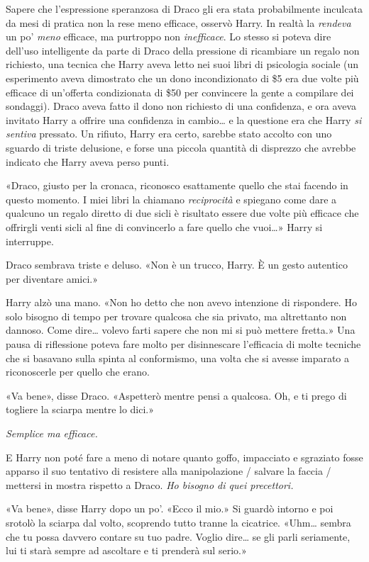 Sapere che l’espressione speranzosa di Draco gli era stata probabilmente inculcata da mesi di pratica non la rese meno efficace, osservò Harry. In realtà la \textit{rendeva} un po’ \textit{meno} efficace, ma purtroppo non \textit{inefficace}. Lo stesso si poteva dire dell’uso intelligente da parte di Draco della pressione di ricambiare un regalo non richiesto, una tecnica che Harry aveva letto nei suoi libri di psicologia sociale (un esperimento aveva dimostrato che un dono incondizionato di \$5 era due volte più efficace di un’offerta condizionata di \$50 per convincere la gente a compilare dei sondaggi). Draco aveva fatto il dono non richiesto di una confidenza, e ora aveva invitato Harry a offrire una confidenza in cambio… e la questione era che Harry \textit{si sentiva} pressato. Un rifiuto, Harry era certo, sarebbe stato accolto con uno sguardo di triste delusione, e forse una piccola quantità di disprezzo che avrebbe indicato che Harry aveva perso punti.

«Draco, giusto per la cronaca, riconosco esattamente quello che stai facendo in questo momento. I miei libri la chiamano \textit{reciprocità} e spiegano come dare a qualcuno un regalo diretto di due sicli è risultato essere due volte più efficace che offrirgli venti sicli al fine di convincerlo a fare quello che vuoi…» Harry si interruppe.

Draco sembrava triste e deluso. «Non è un trucco, Harry. È un gesto autentico per diventare amici.»

Harry alzò una mano. «Non ho detto che non avevo intenzione di rispondere. Ho solo bisogno di tempo per trovare qualcosa che sia privato, ma altrettanto non dannoso. Come dire… volevo farti sapere che non mi si può mettere fretta.» Una pausa di riflessione poteva fare molto per disinnescare l’efficacia di molte tecniche che si basavano sulla spinta al conformismo, una volta che si avesse imparato a riconoscerle per quello che erano.

«Va bene», disse Draco. «Aspetterò mentre pensi a qualcosa. Oh, e ti prego di togliere la sciarpa mentre lo dici.»

\textit{Semplice ma efficace.}

E Harry non poté fare a meno di notare quanto goffo, impacciato e sgraziato fosse apparso il suo tentativo di resistere alla manipolazione / salvare la faccia / mettersi in mostra rispetto a Draco. \textit{Ho bisogno di quei precettori.}

«Va bene», disse Harry dopo un po’. «Ecco il mio.» Si guardò intorno e poi srotolò la sciarpa dal volto, scoprendo tutto tranne la cicatrice. «Uhm… sembra che tu possa davvero contare su tuo padre. Voglio dire… se gli parli seriamente, lui ti starà sempre ad ascoltare e ti prenderà sul serio.»

